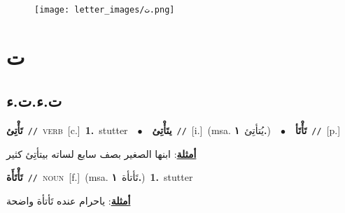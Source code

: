 \documentclass[10pt,a4paper,twoside]{article} %
\begin{document}
\begin{figure*}[t!]\centering\texttt{[image: letter\_images/ت.png]}\end{figure*}
\color{white}

 \section*{\foreignlanguage{arabic}{ت}} 
 \begin{multicols}{2} 

%
\color{black}
\vspace{-3mm}
\subsection*{\color{blue}\foreignlanguage{arabic}{ت.ء.ت.ء}\color{blue}{}} 

{\setlength\topsep{0pt}\textbf{\foreignlanguage{arabic}{تَأْتِئ}}\ {\color{gray}\texttt{//}\color{black}}\ \textsc{verb}\ [c.]\ \textbf{1.}~stutter\ \ $\bullet$\ \ \setlength\topsep{0pt}\textbf{\foreignlanguage{arabic}{يتَأْتِئ}}\ {\color{gray}\texttt{//}\color{black}}\ [i.]\ \color{gray}(msa. \foreignlanguage{arabic}{يُتأتِئ}~\foreignlanguage{arabic}{\textbf{١.}})\color{black}\ \ $\bullet$\ \ \setlength\topsep{0pt}\textbf{\foreignlanguage{arabic}{تَأْتَأ}}\ {\color{gray}\texttt{//}\color{black}}\ [p.]\  \begin{flushright}\color{gray}\foreignlanguage{arabic}{\textbf{\underline{\foreignlanguage{arabic}{أمثلة}}}: ابنها الصغير بصف سابع لساته بيتأتِئ كثير}\end{flushright}\color{black}} \vspace{2mm}

{\setlength\topsep{0pt}\textbf{\foreignlanguage{arabic}{تَأْتَأَة}}\ {\color{gray}\texttt{//}\color{black}}\ \textsc{noun}\ [f.]\ \color{gray}(msa. \foreignlanguage{arabic}{تَأتأة}~\foreignlanguage{arabic}{\textbf{١.}})\color{black}\ \textbf{1.}~stutter\  \begin{flushright}\color{gray}\foreignlanguage{arabic}{\textbf{\underline{\foreignlanguage{arabic}{أمثلة}}}: ياحرام عنده تَأتأة واضحة}\end{flushright}\color{black}} \vspace{2mm}


\end{multicols}
\end{document}
